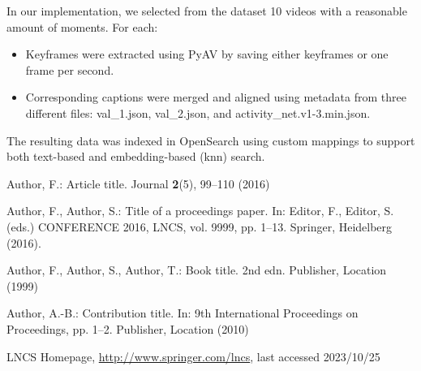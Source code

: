 \documentclass[runningheads]{llncs}
\begin{document}
In our implementation, we selected from the dataset 10 videos with a reasonable amount of moments. For each:

\begin{itemize}
    \item Keyframes were extracted using PyAV by saving either keyframes or one frame per second.
    \item Corresponding captions were merged and aligned using metadata from three different files: val\_1.json, val\_2.json, and activity\_net.v1-3.min.json.
\end{itemize}

The resulting data was indexed in OpenSearch using custom mappings to support both text-based and embedding-based (knn) search.




%
%
%
% 
% 
%
\begin{thebibliography}{8}
Author, F.: Article title. Journal \textbf{2}(5), 99--110 (2016)

Author, F., Author, S.: Title of a proceedings paper. In: Editor,
F., Editor, S. (eds.) CONFERENCE 2016, LNCS, vol. 9999, pp. 1--13.
Springer, Heidelberg (2016). 

Author, F., Author, S., Author, T.: Book title. 2nd edn. Publisher,
Location (1999)

Author, A.-B.: Contribution title. In: 9th International Proceedings
on Proceedings, pp. 1--2. Publisher, Location (2010)

LNCS Homepage, \url{http://www.springer.com/lncs}, last accessed 2023/10/25
\end{thebibliography}
\end{document}
